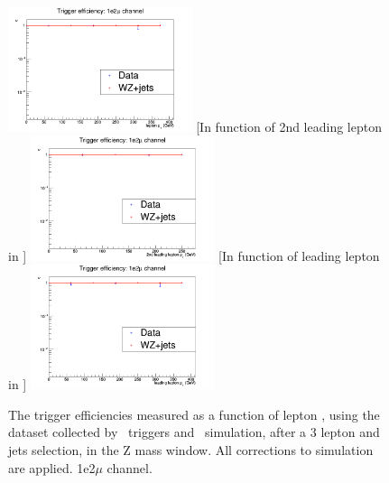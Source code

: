 \begin{figure}[tb]
	[In function of lepton \pt]{
		\includegraphics[width=0.48\textwidth]{Appendix/Figures/trigger/Triggereff/1e2mu/triggeff_1e2muhistPt.png}
		\label{image:triggeff_1e2muhistPt.png}
	}
	[In function of 2nd leading lepton in \pt]{
		\includegraphics[width=0.48\textwidth]{Appendix/Figures/trigger/Triggereff/1e2mu/triggeff_1e2muhistPt_2ndleadinglep.png}
		\label{image:triggeff_1e2muhistPt_2ndleadinglep.png}
	}
	[In function of leading lepton in \pt]{
		\includegraphics[width=0.48\textwidth]{Appendix/Figures/trigger/Triggereff/1e2mu/triggeff_1e2muhistPt_leadinglep.png}
		\label{image:triggeff_1e2muhistPt_leadinglep.png}
	}
	\caption{The trigger efficiencies measured as a function of lepton \pt, using the dataset collected by \Etmis\ triggers and \WZ\ simulation, after a 3 lepton and jets selection, in the Z mass window. All corrections to simulation are applied. 1e2$\mu$ channel.}
	\label{image:FigurestriggerTriggereff1e2mu}
\end{figure}

